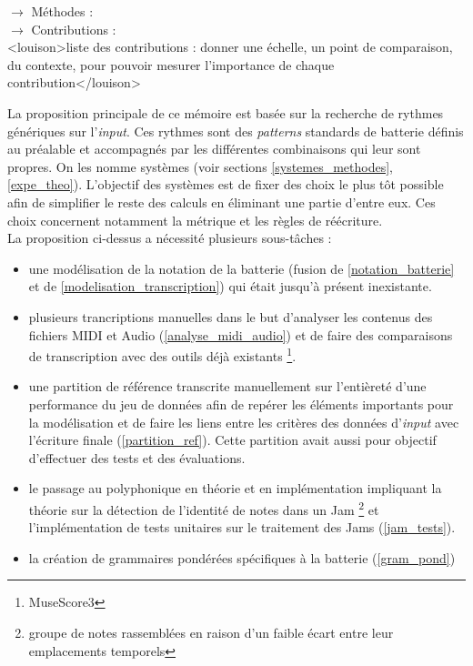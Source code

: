 $\to$ Méthodes :\\
$\to$ Contributions :\\
<louison>liste des contributions : donner une échelle, un point de comparaison, du
contexte, pour pouvoir mesurer l'importance de chaque contribution</louison>

La proposition principale de ce mémoire est basée sur la recherche de rythmes
génériques sur l’\textit{input}. Ces rythmes sont des \textit{patterns}
standards de batterie définis au préalable et accompagnés par les différentes
combinaisons qui leur sont propres. On les nomme systèmes (voir sections
\ref{systemes_methodes}, \ref{expe_theo}). L’objectif des systèmes est de fixer
des choix le plus tôt possible afin de simplifier le reste des calculs en
éliminant une partie d’entre eux. Ces choix concernent notamment la métrique
et les règles de réécriture.\\

La proposition ci-dessus a nécessité plusieurs sous-tâches :
\begin{itemize}
    \item une modélisation de la notation de la batterie
        (fusion de \ref{notation_batterie} et de
        \ref{modelisation_transcription}) qui était jusqu’à présent
        inexistante.
    \item plusieurs trancriptions manuelles dans le but d’analyser les contenus
        des fichiers MIDI et Audio (\ref{analyse_midi_audio}) et de faire des
        comparaisons de transcription avec des outils déjà existants
        \footnote{MuseScore3}.
    \item une partition de référence transcrite manuellement sur l’entièreté
        d’une performance du jeu de données afin de repérer les éléments
        importants pour la modélisation et de faire les liens entre les
        critères des données d’\textit{input} avec l’écriture finale
        (\ref{partition_ref}). Cette partition avait aussi pour objectif
        d’effectuer des tests et des évaluations.
    \item le passage au polyphonique en théorie et en implémentation impliquant
        la théorie sur la détection de l’identité de notes dans un Jam
        \footnote{groupe de notes rassemblées en raison d’un faible écart entre
            leur emplacements temporels} et l’implémentation de tests unitaires
            sur le traitement des Jams (\ref{jam_tests}).
    \item  la création de grammaires pondérées spécifiques à
        la batterie (\ref{gram_pond})\\
\end{itemize}

